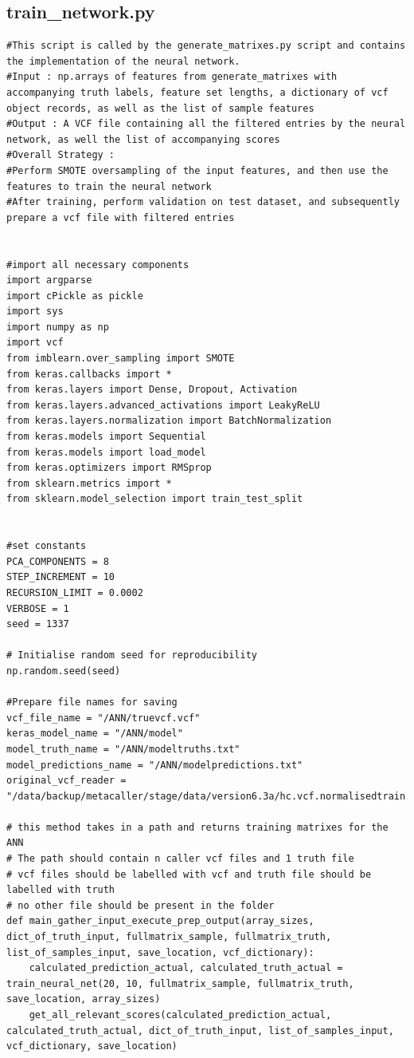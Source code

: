 \documentclass{article}
\begin{document}
\subsection{train\_network.py}

\begin{verbatim}
#This script is called by the generate_matrixes.py script and contains the implementation of the neural network.
#Input : np.arrays of features from generate_matrixes with accompanying truth labels, feature set lengths, a dictionary of vcf object records, as well as the list of sample features 
#Output : A VCF file containing all the filtered entries by the neural network, as well the list of accompanying scores 
#Overall Strategy :
#Perform SMOTE oversampling of the input features, and then use the features to train the neural network
#After training, perform validation on test dataset, and subsequently prepare a vcf file with filtered entries


#import all necessary components 
import argparse
import cPickle as pickle
import sys
import numpy as np
import vcf
from imblearn.over_sampling import SMOTE
from keras.callbacks import *
from keras.layers import Dense, Dropout, Activation
from keras.layers.advanced_activations import LeakyReLU
from keras.layers.normalization import BatchNormalization
from keras.models import Sequential
from keras.models import load_model
from keras.optimizers import RMSprop
from sklearn.metrics import *
from sklearn.model_selection import train_test_split


#set constants
PCA_COMPONENTS = 8
STEP_INCREMENT = 10
RECURSION_LIMIT = 0.0002
VERBOSE = 1
seed = 1337

# Initialise random seed for reproducibility
np.random.seed(seed) 

#Prepare file names for saving
vcf_file_name = "/ANN/truevcf.vcf"
keras_model_name = "/ANN/model"
model_truth_name = "/ANN/modeltruths.txt"
model_predictions_name = "/ANN/modelpredictions.txt"
original_vcf_reader = "/data/backup/metacaller/stage/data/version6.3a/hc.vcf.normalisedtrain.vcf"

# this method takes in a path and returns training matrixes for the ANN
# The path should contain n caller vcf files and 1 truth file
# vcf files should be labelled with vcf and truth file should be labelled with truth
# no other file should be present in the folder
def main_gather_input_execute_prep_output(array_sizes, dict_of_truth_input, fullmatrix_sample, fullmatrix_truth, list_of_samples_input, save_location, vcf_dictionary):
    calculated_prediction_actual, calculated_truth_actual = train_neural_net(20, 10, fullmatrix_sample, fullmatrix_truth,                                                                             save_location, array_sizes)
    get_all_relevant_scores(calculated_prediction_actual, calculated_truth_actual, dict_of_truth_input, list_of_samples_input, vcf_dictionary, save_location)


\end{verbatim}
\end{document}

